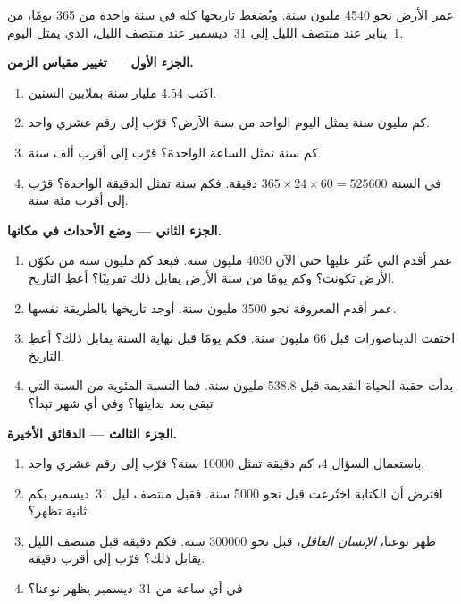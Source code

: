 \begin{problem}
\label{pb:g7:geological-time:1}
عمر الأرض نحو \num{4540} مليون سنة. ويُضغط تاريخها كله في سنة واحدة من 365
يومًا، من 1~يناير عند منتصف الليل إلى 31~ديسمبر عند منتصف الليل، الذي
يمثل اليوم.

\medskip
\noindent\textbf{الجزء الأول --- تغيير مقياس الزمن.}\par\nopagebreak
\begin{enumerate}[beginpenalty=10000]
  \item اكتب \num{4.54} مليار سنة بملايين السنين.
  \item كم مليون سنة يمثل اليوم الواحد من سنة الأرض؟ قرّب إلى رقم عشري
        واحد.
  \item كم سنة تمثل الساعة الواحدة؟ قرّب إلى أقرب ألف سنة.
  \item في السنة $365 \times 24 \times 60 = \num{525600}$ دقيقة. فكم
        سنة تمثل الدقيقة الواحدة؟ قرّب إلى أقرب مئة سنة.
\end{enumerate}

\medskip
\noindent\textbf{الجزء الثاني --- وضع الأحداث في مكانها.}\par\nopagebreak
\begin{enumerate}[resume, beginpenalty=10000]
  \item عمر أقدم  التي عُثر عليها حتى الآن \num{4030} مليون سنة. فبعد
        كم مليون سنة من تكوّن الأرض تكونت؟ وكم يومًا من سنة الأرض يقابل
        ذلك تقريبًا؟ أعطِ التاريخ.
  \item عمر أقدم  المعروفة نحو \num{3500} مليون سنة. أوجد
        تاريخها بالطريقة نفسها.
  \item اختفت الديناصورات قبل \num{66} مليون سنة. فكم يومًا قبل نهاية
        السنة يقابل ذلك؟ أعطِ التاريخ.
  \item بدأت حقبة الحياة القديمة قبل \num{538.8} مليون سنة. فما النسبة
        المئوية من السنة التي تبقى بعد بدايتها؟ وفي أي شهر تبدأ؟
\end{enumerate}

\medskip
\noindent\textbf{الجزء الثالث --- الدقائق الأخيرة.}\par\nopagebreak
\begin{enumerate}[resume, beginpenalty=10000]
  \item باستعمال السؤال 4، كم دقيقة تمثل \num{10000} سنة؟ قرّب إلى رقم
        عشري واحد.
  \item افترض أن الكتابة اختُرعت قبل نحو \num{5000} سنة. فقبل منتصف ليل
        31~ديسمبر بكم ثانية تظهر؟
  \item ظهر نوعنا، \emph{الإنسان العاقل}، قبل نحو \num{300000} سنة. فكم
        دقيقة قبل منتصف الليل يقابل ذلك؟ قرّب إلى أقرب دقيقة.
  \item في أي ساعة من 31~ديسمبر يظهر نوعنا؟
\end{enumerate}
\end{problem}
